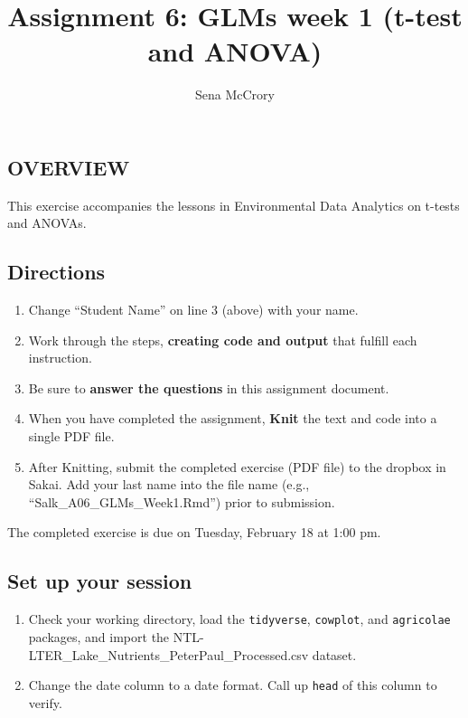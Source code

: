 \documentclass[
]{article}
\title{Assignment 6: GLMs week 1 (t-test and ANOVA)}
\author{Sena McCrory}
\date{}
\providecommand{\tightlist}{%
  \setlength{\itemsep}{0pt}\setlength{\parskip}{0pt}}
\begin{document}
\maketitle

\hypertarget{overview}{%
\subsection{OVERVIEW}\label{overview}}

This exercise accompanies the lessons in Environmental Data Analytics on
t-tests and ANOVAs.

\hypertarget{directions}{%
\subsection{Directions}\label{directions}}

\begin{enumerate}
\def\labelenumi{\arabic{enumi}.}
\tightlist
\item
  Change ``Student Name'' on line 3 (above) with your name.
\item
  Work through the steps, \textbf{creating code and output} that fulfill
  each instruction.
\item
  Be sure to \textbf{answer the questions} in this assignment document.
\item
  When you have completed the assignment, \textbf{Knit} the text and
  code into a single PDF file.
\item
  After Knitting, submit the completed exercise (PDF file) to the
  dropbox in Sakai. Add your last name into the file name (e.g.,
  ``Salk\_A06\_GLMs\_Week1.Rmd'') prior to submission.
\end{enumerate}

The completed exercise is due on Tuesday, February 18 at 1:00 pm.

\hypertarget{set-up-your-session}{%
\subsection{Set up your session}\label{set-up-your-session}}

\begin{enumerate}
\def\labelenumi{\arabic{enumi}.}
\item
  Check your working directory, load the \texttt{tidyverse},
  \texttt{cowplot}, and \texttt{agricolae} packages, and import the
  NTL-LTER\_Lake\_Nutrients\_PeterPaul\_Processed.csv dataset.
\item
  Change the date column to a date format. Call up \texttt{head} of this
  column to verify.
\end{enumerate}
\end{document}

